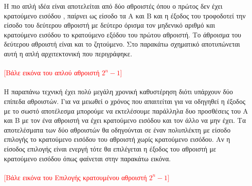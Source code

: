 Η πιο απλή ιδέα είναι αποτελείται από δύο αθροιστές όπου ο πρώτος δεν έχει
κρατούμενο εισόδου , παίρνει ως είσοδο τα Α και Β και η έξοδος του τροφοδοτεί
την είσοδο του δεύτερου αθροιστή με δεύτερο όρισμα τον μηδενικό αριθμό
και κρατούμενο εισόδου το κρατούμενο εξόδου του πρώτου αθροιστή. Το άθροισμα 
του δεύτερου αθροιστή είναι και το ζητούμενο. Στο παρακάτω σχηματικό αποτυπώνεται
αυτή η απλή αρχιτεκτονική που περιγράφηκε.
\\\\
\textcolor{red}{[Βάλε εικόνα του απλού αθροιστή $2^n-1$]}
\\\\
Η παραπάνω τεχνική έχει πολύ μεγάλη χρονική καθυστέρηση διότι υπάρχουν δύο 
επίπεδα αθροιστών. Για να μειωθεί ο χρόνος που απαιτείται για να οδηγηθεί η έξοδος
με το σωστό αποτέλεσμα μπορούμε να εκτελέσουμε παράλληλα δυο προσθέσεις του Α και Β
με τον ένα αθροιστή να έχει κρατούμενο εισόδου και τον άλλο να μην έχει. Τα αποτελέσματα 
των δύο αθροιστών θα οδηγούνται σε έναν πολυπλέκτη με είσοδο επιλογής το κρατούμενο 
εισόδου του αθροιστή χωρίς κρατούμενο εισόδου. Αν η είσοδος επιλογής είναι ενεργή 
τότε θα επιλέγεται η έξοδος του αθροιστή με κρατούμενο εισόδου όπως φαίνεται στην 
παρακάτω εικόνα.
\\\\
\textcolor{red}{[Βάλε εικόνα του Επιλογής κρατουμένου αθροιστή $2^n-1$]}

















